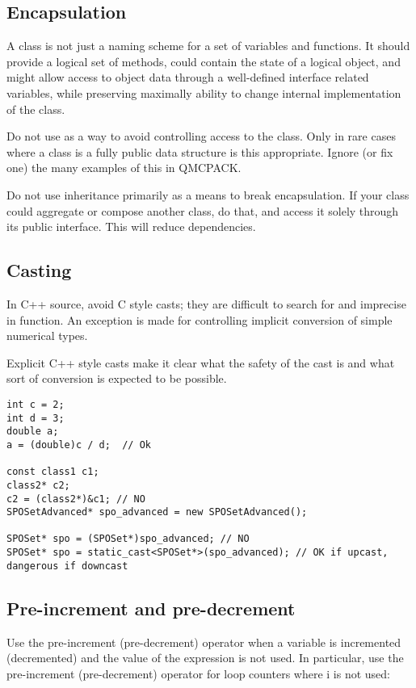 \subsection{Encapsulation}
A class is not just a naming scheme for a set of variables and functions. It should provide a logical set of methods, could contain the state of a logical object, and might allow access to object data through a well-defined interface related variables, while preserving maximally ability to change internal implementation of the class.

Do not use  as a way to avoid controlling access to the class. Only in rare cases where a class is a fully public data structure  is this appropriate. Ignore (or fix one) the many examples of this in QMCPACK.

Do not use inheritance primarily as a means to break encapsulation. If your class could aggregate or compose another class, do that, and access it solely through its public interface. This will reduce dependencies.

\subsection{Casting}
In C++ source, avoid C style casts; they are difficult to search for and imprecise in function.
An exception is made for controlling implicit conversion of simple numerical types.

Explicit C++ style casts make it clear what the safety of the cast is and what sort of conversion is expected to be possible.

\begin{lstlisting}
int c = 2;
int d = 3;
double a;
a = (double)c / d;  // Ok

const class1 c1;
class2* c2;
c2 = (class2*)&c1; // NO
SPOSetAdvanced* spo_advanced = new SPOSetAdvanced();

SPOSet* spo = (SPOSet*)spo_advanced; // NO
SPOSet* spo = static_cast<SPOSet*>(spo_advanced); // OK if upcast, dangerous if downcast
\end{lstlisting}

\subsection{Pre-increment and pre-decrement}
Use the pre-increment (pre-decrement) operator when a variable is incremented (decremented) and the value of the expression is not used.
In particular, use the pre-increment (pre-decrement) operator for loop counters where i is not used:

